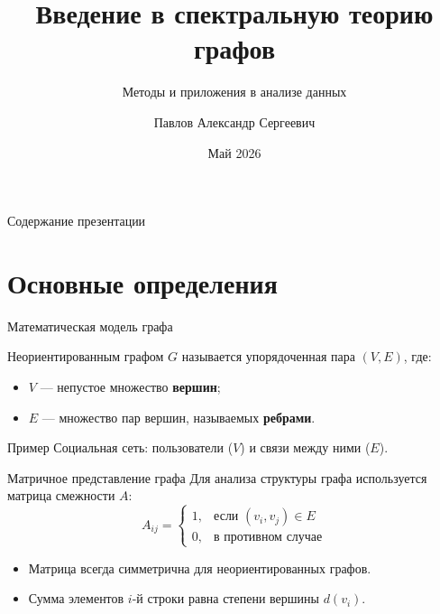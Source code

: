 \documentclass[10pt, aspectratio=169]{beamer}
\title[Теория графов]{Введение в спектральную теорию графов}
\subtitle{Методы и приложения в анализе данных}
\author[Павлов А.С.]{Павлов Александр Сергеевич}
\institute[ПЕТРГУ]{Петрозаводский государственный университет}
\date[2026]{Май 2026}
\begin{document}
\begin{frame}
    \titlepage
\end{frame}

\begin{frame}{Содержание презентации}
    \tableofcontents
\end{frame}

\section{Основные определения}

\begin{frame}{Математическая модель графа}
    \begin{definition}
        Неориентированным графом $G$ называется упорядоченная пара $(V, E)$, где:
        \begin{itemize}
            \item $V$ — непустое множество \textbf{вершин};
            \item $E$ — множество пар вершин, называемых \textbf{ребрами}.
        \end{itemize}
    \end{definition}
    \pause
    \begin{exampleblock}{Пример}
        Социальная сеть: пользователи ($V$) и связи между ними ($E$).
    \end{exampleblock}
\end{frame}

\begin{frame}{Матричное представление графа}
    Для анализа структуры графа используется матрица смежности $A$:
    \begin{equation}
        A_{ij} = 
        \begin{cases} 
        1, & \text{если } (v_i, v_j) \in E \\
        0, & \text{в противном случае}
        \end{cases}
    \end{equation}
    \vspace{0.5cm}
    \begin{itemize}
        \item<2-> Матрица всегда симметрична для неориентированных графов.
        \item<3-> Сумма элементов $i$-й строки равна степени вершины $d(v_i)$.
    \end{itemize}
\end{frame}
\end{document}
